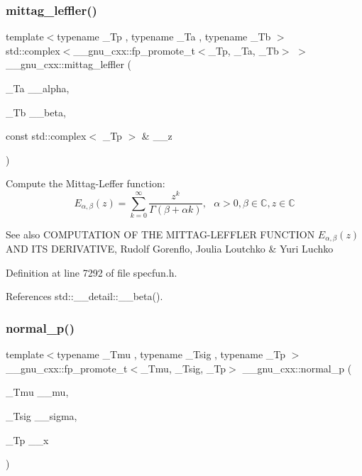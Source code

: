 \subsubsection{\texorpdfstring{mittag\+\_\+leffler()}{mittag\_leffler()}}
{\footnotesize\ttfamily template$<$typename \+\_\+\+Tp , typename \+\_\+\+Ta , typename \+\_\+\+Tb $>$ \\
std\+::complex$<$\+\_\+\+\_\+gnu\+\_\+cxx\+::fp\+\_\+promote\+\_\+t$<$\+\_\+\+Tp, \+\_\+\+Ta, \+\_\+\+Tb$>$ $>$ \+\_\+\+\_\+gnu\+\_\+cxx\+::mittag\+\_\+leffler (\begin{DoxyParamCaption}\item[{\+\_\+\+Ta}]{\+\_\+\+\_\+alpha,  }\item[{\+\_\+\+Tb}]{\+\_\+\+\_\+beta,  }\item[{const std\+::complex$<$ \+\_\+\+Tp $>$ \&}]{\+\_\+\+\_\+z }\end{DoxyParamCaption})\hspace{0.3cm}{\ttfamily [inline]}}

Compute the Mittag-\/\+Leffer function\+: \[ E_{\alpha,\beta}(z) = \sum_{k=0}^\infty \frac{z^k}{\Gamma(\beta + \alpha k)}, \mbox{ } \alpha > 0, \beta \in \mathbb{C}, z \in \mathbb{C} \]

\begin{DoxySeeAlso}{See also}
C\+O\+M\+P\+U\+T\+A\+T\+I\+ON OF T\+HE M\+I\+T\+T\+A\+G-\/\+L\+E\+F\+F\+L\+ER F\+U\+N\+C\+T\+I\+ON $ E_{\alpha,\beta}(z) $ A\+ND I\+TS D\+E\+R\+I\+V\+A\+T\+I\+VE, Rudolf Gorenflo, Joulia Loutchko \& Yuri Luchko 
\end{DoxySeeAlso}


Definition at line 7292 of file specfun.\+h.



References std\+::\+\_\+\+\_\+detail\+::\+\_\+\+\_\+beta().

\mbox{\label{group__mathsf__gnu_gaeb735b0fb98c7684ba61b8940f50193c}} 
\subsubsection{\texorpdfstring{normal\+\_\+p()}{normal\_p()}}
{\footnotesize\ttfamily template$<$typename \+\_\+\+Tmu , typename \+\_\+\+Tsig , typename \+\_\+\+Tp $>$ \\
\+\_\+\+\_\+gnu\+\_\+cxx\+::fp\+\_\+promote\+\_\+t$<$\+\_\+\+Tmu, \+\_\+\+Tsig, \+\_\+\+Tp$>$ \+\_\+\+\_\+gnu\+\_\+cxx\+::normal\+\_\+p (\begin{DoxyParamCaption}\item[{\+\_\+\+Tmu}]{\+\_\+\+\_\+mu,  }\item[{\+\_\+\+Tsig}]{\+\_\+\+\_\+sigma,  }\item[{\+\_\+\+Tp}]{\+\_\+\+\_\+x }\end{DoxyParamCaption})\hspace{0.3cm}{\ttfamily [inline]}}



